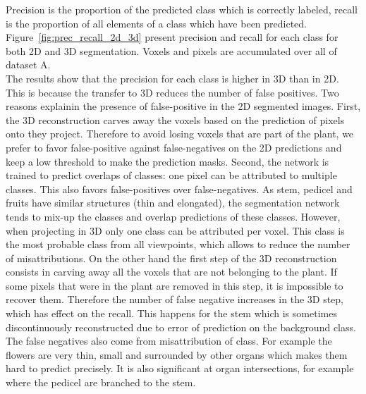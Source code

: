 Precision is the proportion of the predicted class which is correctly labeled,
recall is the proportion of all elements of a class which have been predicted.
Figure~\ref{fig:prec_recall_2d_3d} present precision and recall for each class
for both 2D and 3D segmentation. Voxels and pixels are accumulated over all of
dataset A. \\
The results show that the precision for each class is higher in 3D than in 2D. This is because the transfer to 3D reduces the number of false positives. Two reasons explainin the presence of false-positive in the 2D segmented images. First, the 3D reconstruction carves away the voxels based on the prediction of pixels onto they project. Therefore to avoid losing voxels that are part of the plant, we prefer  to favor false-positive against false-negatives on the 2D predictions and keep a low threshold to make the prediction masks. Second, the network is trained to predict overlaps of classes: one pixel can be attributed to multiple classes. This also favors false-positives over false-negatives. As stem, pedicel and fruits have similar structures (thin and elongated), the segmentation network tends to mix-up the classes and overlap predictions of these classes. However, when projecting in 3D only one class can be attributed per voxel. This class is the most probable class from all viewpoints, which allows to reduce the number of misattributions. On the other hand the first step of the 3D reconstruction consists in carving away all the voxels that are not belonging to the plant. If some pixels that were in the plant are removed in this step, it is impossible to recover them. Therefore the number of false negative increases in the 3D step, which has effect on the recall. This happens for the stem which is sometimes discontinuously reconstructed due to error of prediction on the background class. The false negatives also come from misattribution of class. For example the flowers are very thin, small and surrounded by other organs which makes them hard to predict precisely. It is also significant at organ intersections, for example where the pedicel are branched to the stem. 


